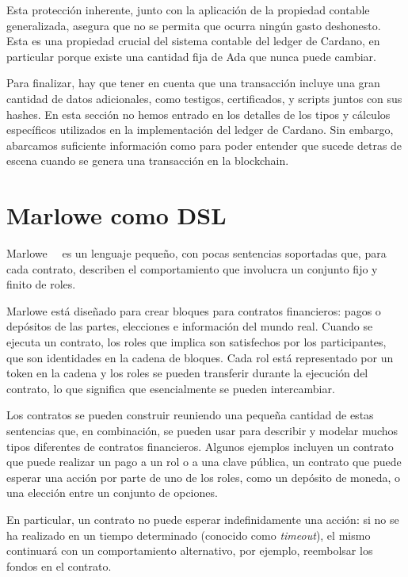 \documentclass[12pt]{book}
\begin{document}
Esta protección inherente, junto con la aplicación de la propiedad contable generalizada, asegura que no se permita que ocurra ningún gasto deshonesto. Esta es una propiedad crucial del sistema contable del ledger de Cardano, en particular porque existe una cantidad fija de Ada que nunca puede cambiar.

Para finalizar, hay que tener en cuenta que una transacción incluye una gran cantidad de datos adicionales, como testigos, certificados, y scripts juntos con sus hashes. En esta sección no hemos entrado en los detalles de los tipos y cálculos específicos utilizados en la implementación del ledger de Cardano. Sin embargo, abarcamos suficiente información como para poder entender que sucede detras de escena cuando se genera una transacción en la blockchain.


\section{Marlowe como DSL}
Marlowe~\cite{implementing_financial_contracts_on_blockchain}~\cite{standardized_crypto_loans} es un lenguaje pequeño, con pocas sentencias soportadas que, para cada contrato, describen el comportamiento que involucra un conjunto fijo y finito de roles.

Marlowe está diseñado para crear bloques para contratos financieros: pagos o depósitos de las partes, elecciones e información del mundo real. Cuando se ejecuta un contrato, los roles que implica son satisfechos por los participantes, que son identidades en la cadena de bloques. Cada rol está representado por un token en la cadena y los roles se pueden transferir durante la ejecución del contrato, lo que significa que esencialmente se pueden intercambiar.

Los contratos se pueden construir reuniendo una pequeña cantidad de estas sentencias que, en combinación, se pueden usar para describir y modelar muchos tipos diferentes de contratos financieros. Algunos ejemplos incluyen un contrato que puede realizar un pago a un rol o a una clave pública, un contrato que puede esperar una acción por parte de uno de los roles, como un depósito de moneda, o una elección entre un conjunto de opciones.

En particular, un contrato no puede esperar indefinidamente una acción: si no se ha realizado en un tiempo determinado (conocido como \textit{timeout}), el mismo continuará con un comportamiento alternativo, por ejemplo, reembolsar los fondos en el contrato.
\end{document}
